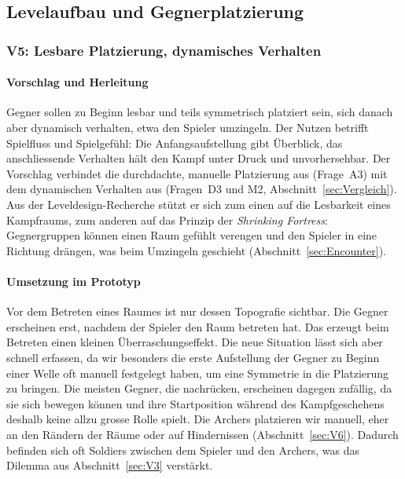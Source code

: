 \documentclass[../Main.tex]{subfiles}
\begin{document}
\subsection{Levelaufbau und Gegnerplatzierung} \label{sec:UmsetzungLevel}

\subsubsection{V5: Lesbare Platzierung, dynamisches Verhalten} \label{sec:V5}

\paragraph{Vorschlag und Herleitung}
Gegner sollen zu Beginn lesbar und teils symmetrisch platziert sein, sich danach aber dynamisch verhalten, etwa den Spieler umzingeln. Der Nutzen betrifft Spielfluss und Spielgefühl: Die Anfangsaufstellung gibt Überblick, das anschliessende Verhalten hält den Kampf unter Druck und unvorhersehbar. Der Vorschlag verbindet die durchdachte, manuelle Platzierung aus  (Frage~A3) mit dem dynamischen Verhalten aus  (Fragen~D3 und M2, Abschnitt~\ref{sec:Vergleich}). Aus der Leveldesign-Recherche stützt er sich zum einen auf die Lesbarkeit eines Kampfraums, zum anderen auf das Prinzip der \textit{Shrinking Fortress}: Gegnergruppen können einen Raum gefühlt verengen und den Spieler in eine Richtung drängen, was beim Umzingeln geschieht (Abschnitt~\ref{sec:Encounter}).

\paragraph{Umsetzung im Prototyp}
Vor dem Betreten eines Raumes ist nur dessen Topografie sichtbar. Die Gegner erscheinen erst, nachdem der Spieler den Raum betreten hat. Das erzeugt beim Betreten einen kleinen Überraschungseffekt. Die neue Situation lässt sich aber schnell erfassen, da wir besonders die erste Aufstellung der Gegner zu Beginn einer Welle oft manuell festgelegt haben, um eine Symmetrie in die Platzierung zu bringen. Die meisten Gegner, die nachrücken, erscheinen dagegen zufällig, da sie sich bewegen können und ihre Startposition während des Kampfgeschehens deshalb keine allzu grosse Rolle spielt. Die Archers platzieren wir manuell, eher an den Rändern der Räume oder auf Hindernissen (Abschnitt~\ref{sec:V6}). Dadurch befinden sich oft Soldiers zwischen dem Spieler und den Archers, was das Dilemma aus Abschnitt~\ref{sec:V3} verstärkt.
\end{document}
